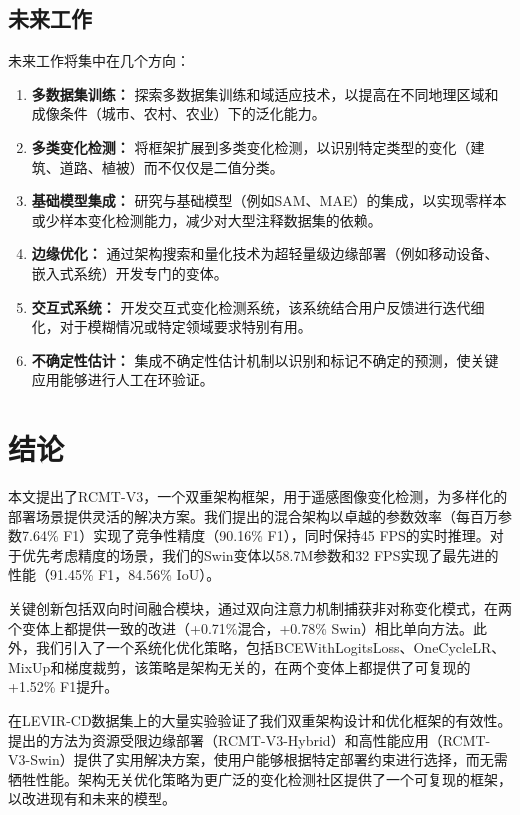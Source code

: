 \documentclass[journal]{IEEEtran}
\begin{document}
\subsection{未来工作}

未来工作将集中在几个方向：

\begin{enumerate}
\item \textbf{多数据集训练：} 探索多数据集训练和域适应技术，以提高在不同地理区域和成像条件（城市、农村、农业）下的泛化能力。

\item \textbf{多类变化检测：} 将框架扩展到多类变化检测，以识别特定类型的变化（建筑、道路、植被）而不仅仅是二值分类。

\item \textbf{基础模型集成：} 研究与基础模型（例如SAM、MAE）的集成，以实现零样本或少样本变化检测能力，减少对大型注释数据集的依赖。

\item \textbf{边缘优化：} 通过架构搜索和量化技术为超轻量级边缘部署（例如移动设备、嵌入式系统）开发专门的变体。

\item \textbf{交互式系统：} 开发交互式变化检测系统，该系统结合用户反馈进行迭代细化，对于模糊情况或特定领域要求特别有用。

\item \textbf{不确定性估计：} 集成不确定性估计机制以识别和标记不确定的预测，使关键应用能够进行人工在环验证。
\end{enumerate}

\section{结论}

本文提出了RCMT-V3，一个双重架构框架，用于遥感图像变化检测，为多样化的部署场景提供灵活的解决方案。我们提出的混合架构以卓越的参数效率（每百万参数7.64\% F1）实现了竞争性精度（90.16\% F1），同时保持45 FPS的实时推理。对于优先考虑精度的场景，我们的Swin变体以58.7M参数和32 FPS实现了最先进的性能（91.45\% F1，84.56\% IoU）。

关键创新包括双向时间融合模块，通过双向注意力机制捕获非对称变化模式，在两个变体上都提供一致的改进（+0.71\%混合，+0.78\% Swin）相比单向方法。此外，我们引入了一个系统化优化策略，包括BCEWithLogitsLoss、OneCycleLR、MixUp和梯度裁剪，该策略是架构无关的，在两个变体上都提供了可复现的+1.52\% F1提升。

在LEVIR-CD数据集上的大量实验验证了我们双重架构设计和优化框架的有效性。提出的方法为资源受限边缘部署（RCMT-V3-Hybrid）和高性能应用（RCMT-V3-Swin）提供了实用解决方案，使用户能够根据特定部署约束进行选择，而无需牺牲性能。架构无关优化策略为更广泛的变化检测社区提供了一个可复现的框架，以改进现有和未来的模型。
\end{document}
